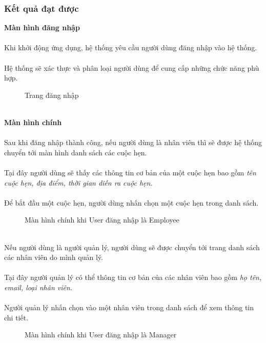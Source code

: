 \documentclass[a4paper]{article}
\begin{document}
\subsubsection{Kết quả đạt được}
\textbf{Màn hình đăng nhập}\\\\
Khi khởi động ứng dụng, hệ thống yêu cầu người dùng đăng nhập vào hệ thống.\\\\
Hệ thống sẽ xác thực và phân loại người dùng để cung cấp những chức năng phù hợp.\\  
\begin{figure}[!h]
    \centering
    \caption{Trang đăng nhập}
    \label{fig:ui_login}
\end{figure} 
\\
\textbf{Màn hình chính}\\\\
Sau khi đăng nhập thành công, nếu người dùng là nhân viên thì sẽ được hệ thống chuyển tới màn hình danh sách các cuộc hẹn.\\\\
Tại đây người dùng sẽ thấy các thông tin cơ bản của một cuộc hẹn bao gồm \textit{tên cuộc hẹn, địa điểm, thời gian diễn ra cuộc hẹn.}\\\\
Để bắt đầu một cuộc hẹn, người dùng nhấn chọn một cuộc hẹn trong danh sách.\\
\begin{figure}[!h]
    \centering
    \caption{Màn hình chính khi User đăng nhập là Employee}
    \label{fig:ui_home}
\end{figure} 
\\
Nếu người dùng là người quản lý, người dùng sẽ được chuyển tới trang danh sách các nhân viên do mình quản lý.\\\\
Tại đây người quản lý có thể thông tin cơ bản của các nhân viên bao gồm \textit{họ tên, email, loại nhân viên.}\\\\
Người quản lý nhấn chọn vào một nhân viên trong danh sách để xem thông tin chi tiết.\\
\begin{figure}[!h]
    \centering
    \caption{Màn hình chính khi User đăng nhập là Manager}
    \label{fig:ui_employee_list}
\end{figure} 
\end{document}
